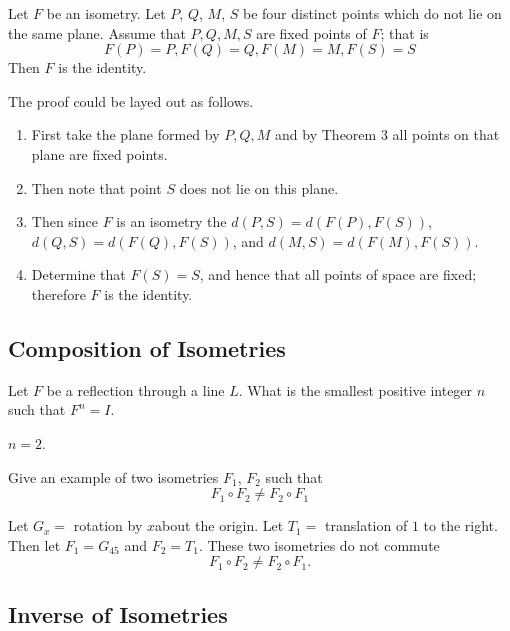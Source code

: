 \begin{theorem}
    Let $F$ be an isometry. Let $P$, $Q$, $M$, $S$ be four distinct points which 
    do not lie on the same plane. Assume that $P, Q, M, S$ are fixed points of $F$;
    that is
        \[F(P) = P, F(Q) = Q, F(M) = M, F(S) = S\]
    Then $F$ is the identity.
\end{theorem}

The proof could be layed out as follows.
\begin{enumerate}
    \item First take the plane formed by $P, Q, M$ and by Theorem $3$ all points on that 
          plane are fixed points.
    \item Then note that point $S$ does not lie on this plane.
    \item Then since $F$ is an isometry the $d(P, S) = d(F(P), F(S))$,
          $d(Q, S) = d(F(Q), F(S))$, and $d(M, S) = d(F(M), F(S))$.
    \item Determine that $F(S) = S$, and hence that all points of space are fixed; therefore $F$ is the identity.
\end{enumerate}

\subsection{Composition of Isometries}

\begin{tcolorbox}[title=Problem 1, breakable]
    Let $F$ be a reflection through a line $L$. What is the smallest positive 
    integer $n$ such that $F^n = I$.
\end{tcolorbox}


$n = 2$.

\begin{tcolorbox}[title=Problem 4, breakable]
    Give an example of two isometries $F_1$, $F_2$ such that 
    \[F_1 \circ F_2 \ne F_2 \circ F_1\]
\end{tcolorbox}


Let $G_x = $ rotation by $x$\textdegree about the origin.
Let $T_1 = $ translation of $1$ to the right.
Then let $F_1 = G_{45}$ and $F_2 = T_1$.  
These two isometries do not commute
\[
F_1 \circ F_2 \ne F_2 \circ F_1.
\]

\subsection{Inverse of Isometries}

